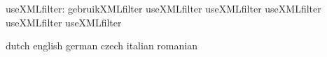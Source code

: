                     useXMLfilter: gebruikXMLfilter                 useXMLfilter
                                  useXMLfilter                     useXMLfilter
                                  useXMLfilter                     useXMLfilter

\stopcommands




\startcommands                    dutch                            english
                                  german                           czech
                                  italian                          romanian

